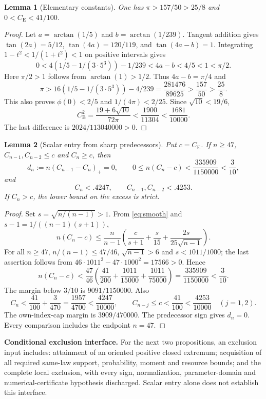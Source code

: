 \documentclass[11pt,a4paper]{article}
\newtheorem{lemma}{Lemma}
\newcommand{\CE}{C_{\mathrm E}}
\begin{document}
\begin{lemma}[Elementary constants]\label{lem:constants}
One has $\pi>157/50>25/8$ and $0<\CE<41/100$.
\end{lemma}
\begin{proof}
Let $a=\arctan(1/5)$ and $b=\arctan(1/239)$. Tangent addition gives
$\tan(2a)=5/12$, $\tan(4a)=120/119$, and $\tan(4a-b)=1$.
Integrating $1-t^2<1/(1+t^2)<1$ on positive intervals gives
\[
 0<4(1/5-1/(3\cdot5^3))-1/239<4a-b<4/5<1<\pi/2.
\]
Here $\pi/2>1$ follows from $\arctan(1)>1/2$.
Thus $4a-b=\pi/4$ and
\[
 \pi>16(1/5-1/(3\cdot5^3))-4/239
       =\frac{281476}{89625}>\frac{157}{50}>\frac{25}{8}.
\]
This also proves $\phi(0)<2/5$ and $1/(4\pi)<2/25$.
Since $\sqrt{10}<19/6$,
\[
 \CE^2=\frac{19+6\sqrt{10}}{72\pi}
 <\frac{1900}{11304}<\frac{1681}{10000}.
\]
The last difference is $2024/113040000>0$.
\end{proof}

\begin{lemma}[Scalar entry from sharp predecessors]\label{lem:gates}
Put $c=\CE$. If $n\ge47$, $C_{n-1},C_{n-2}\le c$ and $C_n\ge c$, then
\[
 d_n:=n(C_{n-1}-C_n)_+=0,\qquad
 0\le n(C_n-c)<\frac{335909}{1150000}<\frac3{10},
\]
and
\[
 C_n<.4247,\qquad C_{n-1},C_{n-2}<.4253.
\]
If $C_n>c$, the lower bound on the excess is strict.
\end{lemma}
\begin{proof}
Set $s=\sqrt{n/(n-1)}>1$. From \eqref{eq:smooth} and
$s-1=1/((n-1)(s+1))$,
\[
 n(C_n-c)\le\frac n{n-1}
       \left(\frac c{s+1}+\frac s{15}
                         +\frac{2s}{25\sqrt{n-1}}\right).
\]
For all $n\ge47$, $n/(n-1)\le47/46$, $\sqrt{n-1}>6$ and
$s<1011/1000$; the last assertion follows from
$46\cdot1011^2-47\cdot1000^2=17566>0$. Hence
\[
 n(C_n-c)<
 \frac{47}{46}\left(\frac{41}{200}
                  +\frac{1011}{15000}+\frac{1011}{75000}\right)
 =\frac{335909}{1150000}<\frac3{10}.
\]
The margin below $3/10$ is $9091/1150000$. Also
\[
 C_n<\frac{41}{100}+\frac3{470}
     =\frac{1957}{4700}<\frac{4247}{10000},
 \qquad
 C_{n-j}\le c<\frac{41}{100}<\frac{4253}{10000}\quad(j=1,2).
\]
The own-index-cap margin is $3909/470000$. The predecessor sign gives
$d_n=0$. Every comparison includes the endpoint $n=47$.
\end{proof}

\noindent\textbf{Conditional exclusion interface.}
For the next two propositions, an exclusion input includes: attainment
of an oriented positive closed extremum; acquisition of all required
same-law support, probability, moment and resource bounds; and the complete
local exclusion, with every sign, normalization, parameter-domain and
numerical-certificate hypothesis discharged.
Scalar entry alone does not establish this interface.
\end{document}
